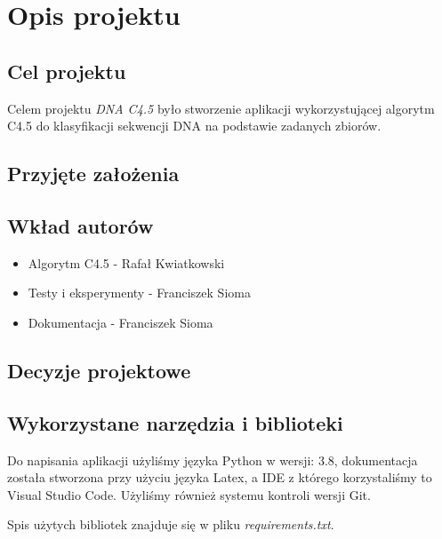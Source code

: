 \section{Opis projektu}
\subsection{Cel projektu}
Celem projektu {\it DNA C4.5} było stworzenie aplikacji wykorzystującej algorytm C4.5 do klasyfikacji sekwencji DNA na podstawie zadanych zbiorów. 

\subsection{Przyjęte założenia}

\subsection{Wkład autorów}
\begin{itemize}
    \item Algorytm C4.5 - Rafał Kwiatkowski
    \item Testy i eksperymenty - Franciszek Sioma
    \item Dokumentacja - Franciszek Sioma
\end{itemize}
\subsection{Decyzje projektowe}

\subsection{Wykorzystane narzędzia i biblioteki}
Do napisania aplikacji użyliśmy języka Python w wersji: 3.8, dokumentacja została stworzona przy użyciu języka Latex, a IDE z którego korzystaliśmy to Visual Studio Code. Użyliśmy również systemu kontroli wersji Git.

Spis użytych bibliotek znajduje się w pliku {\it requirements.txt}.